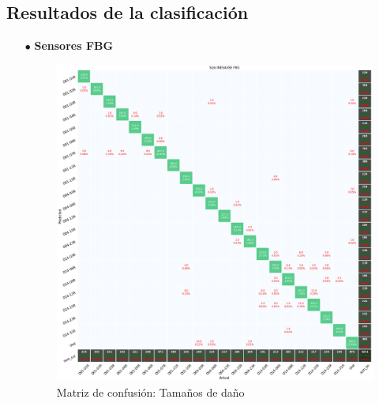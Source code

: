 \subsection{Resultados de la clasificación}

\begin{itemize}
    \item[$\bullet$] \textbf{Sensores FBG}

    \begin{figure}[H]
        \centering
        \includegraphics[width=150mm]{3/Fotos/Ty_Si_INESASSE_confusion.png}
        \captionsetup{justification=centering,margin=1.25cm}
        \caption{Matriz de confusión: Tamaños de daño}
        \label{fig:CM_FBG_Ty_Si}
    \end{figure} 


\end{itemize}
